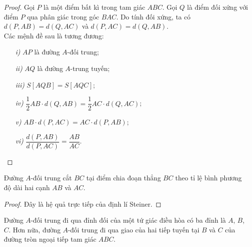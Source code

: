         \begin{proof}
            Gọi \(P\) là một điểm bất kì trong tam giác \(ABC\). Gọi \(Q\) là điểm đối xứng với điểm \(P\) qua phân giác trong góc \(BAC\). Do tính đối xứng, ta có \(d(P,AB) = d(Q,AC)\) và \(d(P,AC) = d(Q,AB)\).\\
            Các mệnh đề sau là tương đương:
            \begin{multicols}{2}
                \begin{enumerate}
                    \item[\textit{i)}] \(AP\) là đường \(A\)-đối trung;
                    \item[\textit{ii)}] \(AQ\) là đường \(A\)-trung tuyến;
                    \item[\textit{iii)}] \(S[AQB] = S[AQC]\);
                \end{enumerate}
        
                \columnbreak
                
                \begin{enumerate}
                    \item[\textit{iv)}] \(\dfrac{1}{2} AB \cdot d(Q,AB) = \dfrac{1}{2} AC \cdot d(Q,AC)\);
                    \item[\textit{v)}] \(AB \cdot d(P,AC) = AC \cdot d(P,AB)\);
                    \item[\textit{vi)}] \(\dfrac{d(P,AB)}{d(P,AC)} = \dfrac{AB}{AC}\).
                \end{enumerate}
            \end{multicols}
        \end{proof}

        \begin{property}
            Đường \(A\)-đối trung cắt \(BC\) tại điểm chia đoạn thẳng \(BC\) theo tỉ lệ bình phương độ dài hai cạnh \(AB\) và \(AC\).
        \end{property}

        \begin{proof}
            Đây là hệ quả trực tiếp của định lí Steiner.
        \end{proof}

        \begin{property}
            Đường \(A\)-đối trung đi qua đỉnh đối của một tứ giác điều hòa có ba đỉnh là \(A\), \(B\), \(C\). Hơn nữa, đường \(A\)-đối trung đi qua giao của hai tiếp tuyến tại \(B\) và \(C\) của đường tròn ngoại tiếp tam giác \(ABC\).
        \end{property}

